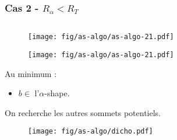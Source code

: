 \documentclass{beamer}
\begin{document}
\begin{frame}
\frametitle{Cas 2 - $R_{\alpha} < R_T$}
 
  \begin{columns}[t]
   \begin{column}{7cm}
      {
        \begin{figure}[h!]
          \centering
          \texttt{[image: fig/as-algo/as-algo-21.pdf]}
      \end{figure}
      }
      {
        \begin{figure}[h!]
          \centering
          \texttt{[image: fig/as-algo/as-algo-21.pdf]}
      \end{figure}
      }
      {
          \begin{block}{}
            \alert{Au minimum} :
            \begin{itemize}
              \item $b \in$ l'$\alpha$-shape.
            \end{itemize}
            On recherche les autres sommets potentiels.
          \end{block}
      }         
      {
        \begin{figure}[h!]
          \centering
          \texttt{[image: fig/as-algo/dicho.pdf]}
      \end{figure}
      }
      

\end{column}
\end{columns}
\end{frame}
\end{document}
